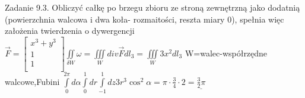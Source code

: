 \documentclass{article}
\begin{document}
Zadanie 9.3.
\newline
\newline
Obliczyć całkę po brzegu zbioru ze stroną zewnętrzną jako dodatnią (powierzchnia walcowa i dwa koła- rozmaitości, reszta miary 0),
spełnia więc założenia twierdzenia o dywergencji\newline
$
\overrightarrow{F}=\left[\begin{array}{c}x^3+y^3\\1\\1\\\end{array}\right]
\iint\limits_{\delta W}\omega=\iiint\limits_{W}div\overrightarrow{F}dl_3=\iiint\limits_{W}3x^2dl_3
$
W=walec-współrzędne walcowe,Fubini
$
\int\limits_{0}^{2\pi}d\alpha\int\limits_{0}^{1}dr\int\limits_{-1}^{1}dz 3r^3\cos^2{\alpha}
=
\pi\cdot\frac{3}{4}\cdot2=\underline{\frac{3}{2}\pi}
$
\newline
\newline
\end{document}
